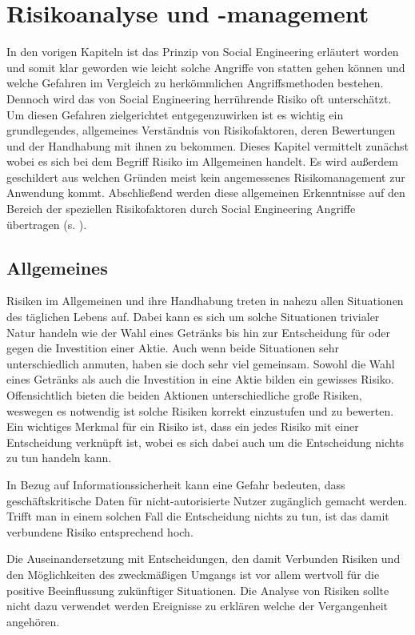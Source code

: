 \section{Risikoanalyse und -management}\label{sec:risikoanalyse}
In den vorigen Kapiteln ist das Prinzip von Social Engineering erläutert worden und somit klar
geworden wie leicht solche Angriffe von statten gehen können und welche Gefahren im Vergleich zu
herkömmlichen Angriffsmethoden bestehen.
Dennoch wird das von Social Engineering herrührende Risiko oft unterschätzt.
Um diesen Gefahren zielgerichtet entgegenzuwirken ist es wichtig ein grundlegendes, allgemeines
Verständnis von Risikofaktoren, deren Bewertungen und der Handhabung mit ihnen zu bekommen.
Dieses Kapitel vermittelt zunächst wobei es sich bei dem Begriff Risiko im Allgemeinen handelt.
Es wird außerdem geschildert aus welchen Gründen meist kein angemessenes Risikomanagement
zur Anwendung kommt.
Abschließend werden diese allgemeinen Erkenntnisse auf den Bereich der speziellen Risikofaktoren durch
Social Engineering Angriffe übertragen (s. ).

\subsection{Allgemeines}\label{sec:allgemeines}
Risiken im Allgemeinen und ihre Handhabung treten in nahezu allen Situationen des täglichen Lebens
auf.
Dabei kann es sich um solche Situationen trivialer Natur handeln wie der Wahl eines Getränks bis hin
zur Entscheidung für oder gegen die Investition einer Aktie.
Auch wenn beide Situationen sehr unterschiedlich anmuten, haben sie doch sehr viel gemeinsam.
Sowohl die Wahl eines Getränks als auch die Investition in eine Aktie bilden ein gewisses Risiko.
Offensichtlich bieten die beiden Aktionen unterschiedliche große Risiken, weswegen es notwendig ist
solche Risiken korrekt einzustufen und zu bewerten.
Ein wichtiges Merkmal für ein Risiko ist, dass ein jedes Risiko mit einer Entscheidung verknüpft ist,
wobei es sich dabei auch um die Entscheidung nichts zu tun handeln kann.

In Bezug auf Informationssicherheit kann eine Gefahr bedeuten, dass geschäftskritische Daten für
nicht-autorisierte Nutzer zugänglich gemacht werden.
Trifft man in einem solchen Fall die Entscheidung nichts zu tun, ist das damit verbundene Risiko
entsprechend hoch.

Die Auseinandersetzung mit Entscheidungen, den damit Verbunden Risiken und den Möglichkeiten des
zweckmäßigen Umgangs ist vor allem wertvoll für die positive Beeinflussung zukünftiger Situationen.
Die Analyse von Risiken sollte nicht dazu verwendet werden Ereignisse zu erklären welche der
Vergangenheit angehören.

